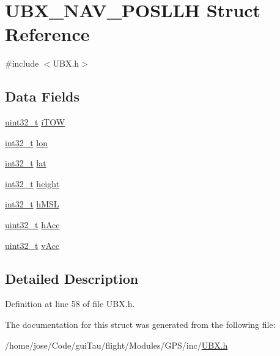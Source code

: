 \hypertarget{struct_u_b_x___n_a_v___p_o_s_l_l_h}{\section{U\-B\-X\-\_\-\-N\-A\-V\-\_\-\-P\-O\-S\-L\-L\-H Struct Reference}
\label{struct_u_b_x___n_a_v___p_o_s_l_l_h}
}


{\ttfamily \#include $<$U\-B\-X.\-h$>$}

\subsection*{Data Fields}
\begin{DoxyCompactItemize}
\item 
\hyperlink{stdint_8h_a435d1572bf3f880d55459d9805097f62}{uint32\-\_\-t} \hyperlink{group___g_s_p_module_ga85f34b0228c0157d478dfcefef43096f}{i\-T\-O\-W}
\item 
\hyperlink{group___n_a_m_e_gafd12020da5a235dfcf0c3c748fb5baed}{int32\-\_\-t} \hyperlink{group___g_s_p_module_ga754c2e4fe17d3fc6b627416bc1ff2110}{lon}
\item 
\hyperlink{group___n_a_m_e_gafd12020da5a235dfcf0c3c748fb5baed}{int32\-\_\-t} \hyperlink{group___g_s_p_module_ga41a8c2e9da88805da15971d21c633f6f}{lat}
\item 
\hyperlink{group___n_a_m_e_gafd12020da5a235dfcf0c3c748fb5baed}{int32\-\_\-t} \hyperlink{group___g_s_p_module_gacb639227d81a2413277fb492f6b450a0}{height}
\item 
\hyperlink{group___n_a_m_e_gafd12020da5a235dfcf0c3c748fb5baed}{int32\-\_\-t} \hyperlink{group___g_s_p_module_gaf78fd4a28f1595624f28d0df15bfcfac}{h\-M\-S\-L}
\item 
\hyperlink{stdint_8h_a435d1572bf3f880d55459d9805097f62}{uint32\-\_\-t} \hyperlink{group___g_s_p_module_gaf3b4eaeb1feedb8295a519b23a76bf83}{h\-Acc}
\item 
\hyperlink{stdint_8h_a435d1572bf3f880d55459d9805097f62}{uint32\-\_\-t} \hyperlink{group___g_s_p_module_gacd74a5379c0196b551432578f7ef6e4f}{v\-Acc}
\end{DoxyCompactItemize}


\subsection{Detailed Description}


Definition at line 58 of file U\-B\-X.\-h.



The documentation for this struct was generated from the following file\-:\begin{DoxyCompactItemize}
\item 
/home/jose/\-Code/gui\-Tau/flight/\-Modules/\-G\-P\-S/inc/\hyperlink{_u_b_x_8h}{U\-B\-X.\-h}\end{DoxyCompactItemize}
